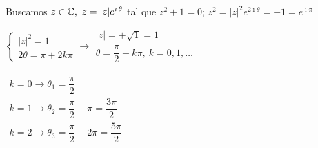 Buscamos $z\in\mathbb{C},~z=|z|e^{\operatorname{\imath}\theta}$ tal que $z^2+1=0$; $z^2=|z|^2e^{2\imath\theta}=-1=e^{\imath\pi}$ 

$\left\lbrace\begin{array}{l}
	|z|^2=1 \\
	2\theta=\pi+2k\pi
\end{array}\right.\longrightarrow\begin{array}{l}
	|z|=+\sqrt{1}=1 \\
	\theta=\dfrac{\pi}{2}+k\pi,~k=0,1,\dots
\end{array}$

$\begin{array}{l}
	k=0\longrightarrow\theta_1=\dfrac{\pi}{2}\\ k=1\longrightarrow\theta_2=\dfrac{\pi}{2}+\pi=\dfrac{3\pi}{2}\\
	k=2\longrightarrow\theta_3=\dfrac{\pi}{2}+2\pi=\dfrac{5\pi}{2}
\end{array}$